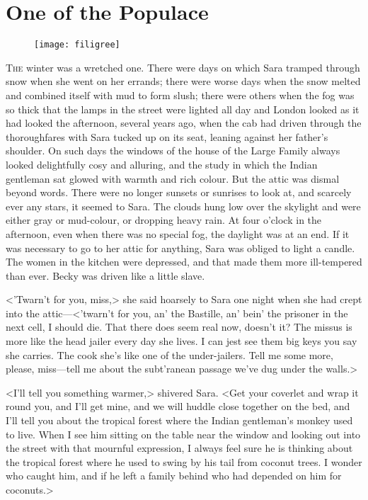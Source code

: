 \chapter{One of the Populace}

\begin{figure}[t!]
\centering
\texttt{[image: filigree]}
\end{figure}

\lettrine[lines=5]{T}{he} winter was a wretched one. There were days on which Sara tramped through snow when she went on her errands; there were worse days when the snow melted and combined itself with mud to form slush; there were others when the fog was so thick that the lamps in the street were lighted all day and London looked as it had looked the afternoon, several years ago, when the cab had driven through the thoroughfares with Sara tucked up on its seat, leaning against her father's shoulder. On such days the windows of the house of the Large Family always looked delightfully cosy and alluring, and the study in which the Indian gentleman sat glowed with warmth and rich colour. But the attic was dismal beyond words. There were no longer sunsets or sunrises to look at, and scarcely ever any stars, it seemed to Sara. The clouds hung low over the skylight and were either gray or mud-colour, or dropping heavy rain. At four o'clock in the afternoon, even when there was no special fog, the daylight was at an end. If it was necessary to go to her attic for anything, Sara was obliged to light a candle. The women in the kitchen were depressed, and that made them more ill-tempered than ever. Becky was driven like a little slave.

<'Twarn't for you, miss,> she said hoarsely to Sara one night when she had crept into the attic—<'twarn't for you, an' the Bastille, an' bein' the prisoner in the next cell, I should die. That there does seem real now, doesn't it? The missus is more like the head jailer every day she lives. I can jest see them big keys you say she carries. The cook she's like one of the under-jailers. Tell me some more, please, miss—tell me about the subt'ranean passage we've dug under the walls.>

<I'll tell you something warmer,> shivered Sara. <Get your coverlet and wrap it round you, and I'll get mine, and we will huddle close together on the bed, and I'll tell you about the tropical forest where the Indian gentleman's monkey used to live. When I see him sitting on the table near the window and looking out into the street with that mournful expression, I always feel sure he is thinking about the tropical forest where he used to swing by his tail from coconut trees. I wonder who caught him, and if he left a family behind who had depended on him for coconuts.>

